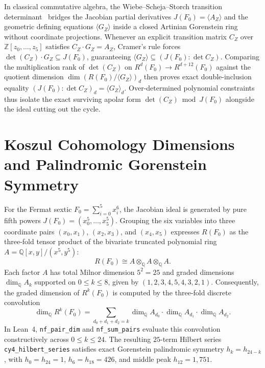 \documentclass[11pt,a4paper]{article}
\begin{document}
In classical commutative algebra, the Wiebe--Scheja--Storch transition determinant~\cite{Macaulay1916} bridges the Jacobian partial derivatives $J(F_0) = \langle A_Z \rangle$ and the geometric defining equations $\langle G_Z \rangle$ inside a closed Artinian Gorenstein ring without coordinate projections. Whenever an explicit transition matrix $C_Z$ over $\mathbb{Z}[z_0,\dots,z_5]$ satisfies $C_Z \cdot G_Z = A_Z$, Cramer's rule forces $\det(C_Z) \cdot G_Z \subseteq J(F_0)$, guaranteeing $\langle G_Z \rangle \subseteq (J(F_0) : \det C_Z)$. Comparing the multiplication rank of $\det(C_Z)$ on $R^d(F_0) \to R^{d+12}(F_0)$ against the quotient dimension $\dim (R(F_0)/\langle G_Z \rangle)_d$ then proves exact double-inclusion equality $(J(F_0) : \det C_Z)_d = \langle G_Z \rangle_d$. Over-determined polynomial constraints thus isolate the exact surviving apolar form $\det(C_Z) \bmod J(F_0)$ alongside the ideal cutting out the cycle.

\section{Koszul Cohomology Dimensions and Palindromic Gorenstein Symmetry}

For the Fermat sextic $F_0 = \sum_{i=0}^5 x_i^6$, the Jacobian ideal is generated by pure fifth powers $J(F_0) = (x_0^5, \dots, x_5^5)$. Grouping the six variables into three coordinate pairs $(x_0, x_1)$, $(x_2, x_3)$, and $(x_4, x_5)$ expresses $R(F_0)$ as the three-fold tensor product of the bivariate truncated polynomial ring $A = \mathbb{Q}[x, y] / (x^5, y^5)$:
\begin{equation}
  R(F_0) \cong A \otimes_{\mathbb{Q}} A \otimes_{\mathbb{Q}} A.
\end{equation}
Each factor $A$ has total Milnor dimension $5^2 = 25$ and graded dimensions $\dim_{\mathbb{Q}} A_k$ supported on $0 \le k \le 8$, given by $(1, 2, 3, 4, 5, 4, 3, 2, 1)$. Consequently, the graded dimension of $R^k(F_0)$ is computed by the three-fold discrete convolution
\begin{equation}
  \dim_{\mathbb{Q}} R^k(F_0) = \sum_{d_0 + d_1 + d_2 = k} \dim_{\mathbb{Q}} A_{d_0} \cdot \dim_{\mathbb{Q}} A_{d_1} \cdot \dim_{\mathbb{Q}} A_{d_2}.
\end{equation}
In Lean~4, \texttt{nf\_pair\_dim} and \texttt{nf\_sum\_pairs} evaluate this convolution constructively across $0 \le k \le 24$. The resulting $25$-term Hilbert series \texttt{cy4\_hilbert\_series} satisfies exact Gorenstein palindromic symmetry $h_k = h_{24-k}$, with $h_0 = h_{24} = 1$, $h_6 = h_{18} = 426$, and middle peak $h_{12} = 1{,}751$.
\end{document}
